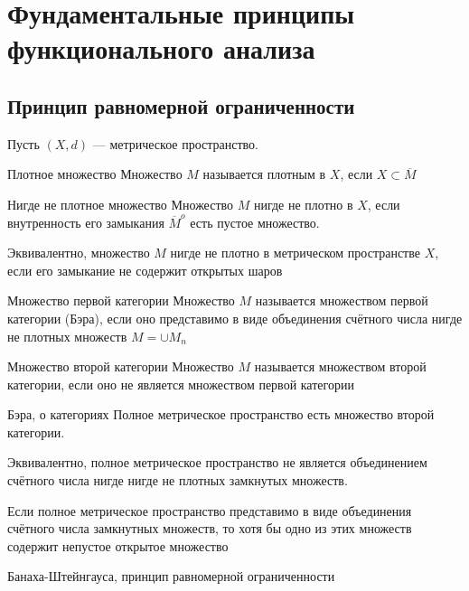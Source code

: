 \section{Фундаментальные принципы функционального анализа}

\subsection{Принцип равномерной ограниченности}

Пусть $(X, d)$ --- метрическое пространство.

\begin{dfn}{Плотное множество}
  Множество $M$ называется плотным в $X$,
  если $X\subset \overline M$
\end{dfn}

\begin{dfn}{Нигде не плотное множество}
  Множество $M$ нигде не плотно в $X$,
  если внутренность его замыкания
  ${\overline M}^o$ есть пустое множество.

  Эквивалентно,
  множество $M$ нигде не плотно
  в метрическом пространстве $X$,
  если его замыкание
  не содержит открытых шаров
\end{dfn}

\begin{dfn}{Множество первой категории}
  Множество $M$ называется
  множеством первой категории (Бэра),
  если оно представимо в виде
  объединения счётного числа нигде не плотных множеств
  $M = \cup M_n$
\end{dfn}

\begin{dfn}{Множество второй категории}
  Множество $M$ называется
  множеством второй категории,
  если оно не является
  множеством первой категории
\end{dfn}

\begin{thm}{Бэра, о категориях}
  Полное метрическое пространство
  есть множество второй категории.

  Эквивалентно,
  полное метрическое пространство
  не является объединением счётного числа
  нигде нигде не плотных замкнутых множеств.
\end{thm}
\begin{corollary}
  Если полное метрическое пространство
  представимо в виде объединения
  счётного числа замкнутных множеств,
  то хотя бы одно из этих множеств
  содержит непустое открытое множество
\end{corollary}

\begin{thm}{Банаха-Штейнгауса, принцип равномерной ограниченности}
  
\end{thm}
